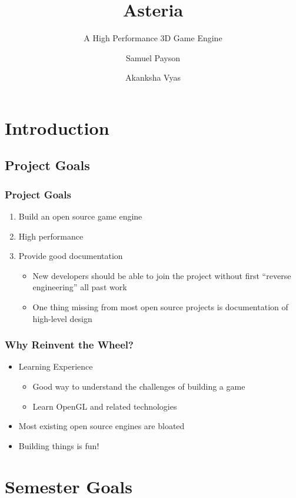 \documentclass{beamer}
\title[Asteria]{Asteria}
\subtitle{A High Performance 3D Game Engine}
\author{Samuel Payson \and Akanksha Vyas}
\begin{document}
\begin{frame}
\titlepage
\end{frame}

\section{Introduction}

\subsection{Project Goals}

\begin{frame}
   \frametitle{Project Goals}
   \begin{enumerate}
      \item Build an open source game engine
      \item High performance
      \item Provide good documentation
      \begin{itemize}
         \item New developers should be able to join the project without first
         ``reverse engineering'' all past work
         \item One thing missing from most open source projects is
         documentation of high-level design
      \end{itemize}
   \end{enumerate}
\end{frame}

\begin{frame}
   \frametitle{Why Reinvent the Wheel?}
   \begin{itemize}
      \item Learning Experience
      \begin{itemize}
         \item Good way to understand the challenges of building a game
         \item Learn OpenGL and related technologies
      \end{itemize}
      \item Most existing open source engines are bloated
      \item Building things is fun!
   \end{itemize}
\end{frame}

\section{Semester Goals}
\end{document}
